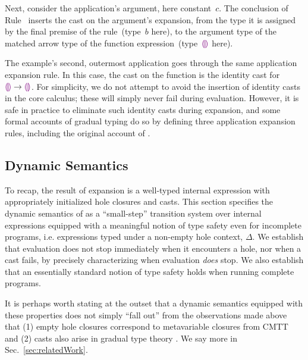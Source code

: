 Next, consider the application's argument, here constant~$c$.
%
The conclusion of Rule~ inserts the cast on the argument's
expansion, from the type it is assigned by the final premise of the
rule~(type~$b$ here), to the argument type of the matched arrow type
of the function expression~(type~$\textcolor{violet}{\llparenthesis}\textcolor{violet}{\rrparenthesis}$ here).

The example's second, outermost application goes through the same
application expansion rule.
%
In this case, the cast on the function is the identity cast for
$\textcolor{violet}{\llparenthesis}\textcolor{violet}{\rrparenthesis} \rightarrow \textcolor{violet}{\llparenthesis}\textcolor{violet}{\rrparenthesis}$.
%
For simplicity, we do not attempt to avoid the insertion of identity
casts in the core calculus; these will simply never fail during
evaluation.
%
However, it is safe in practice to eliminate such identity casts during expansion,
and some formal accounts of gradual typing do so by defining three
application expansion rules, including the original account of \citet{Siek06a}.

\subsection{Dynamic Semantics}
\label{sec:evaluation}

To recap, the result of expansion is a well-typed internal expression with appropriately initialized hole closures and casts.
This section specifies the dynamic semantics of \HazelnutLive as a ``small-step'' transition system over internal expressions equipped with a meaningful notion of type safety even for incomplete programs, i.e. expressions typed under a non-empty hole context, $\Delta$.
We establish that evaluation does not stop immediately when it encounters a hole, nor when a cast fails, by precisely characterizing when evaluation \emph{does} stop.
We also establish that an essentially standard notion of type safety holds when running complete programs.

It is perhaps worth stating at the outset that a dynamic semantics equipped with these properties does not simply ``fall out'' from the observations made above that (1) empty hole closures correspond to metavariable closures from CMTT \cite{Nanevski2008} and (2) casts also arise in gradual type theory \cite{DBLP:conf/snapl/SiekVCB15}.
%
We say more in Sec.~\ref{sec:relatedWork}.
%








